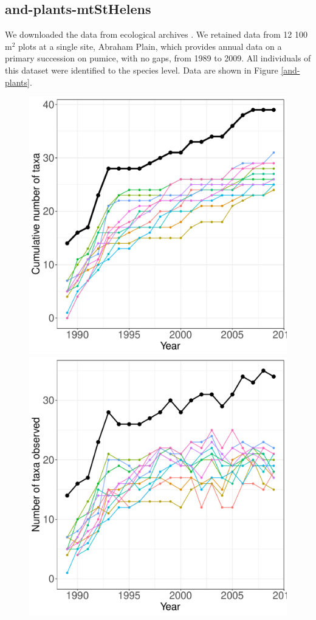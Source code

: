 \documentclass[11pt, oneside]{article}
\begin{document}
\subsection {and-plants-mtStHelens}
We downloaded the data from ecological archives \citep{del_moral_thirty_2010}. We retained data from 12 100 m$^2$ plots at a single site, Abraham Plain, which provides annual data on a primary succession on pumice, with no gaps, from 1989 to 2009. All individuals of this dataset were identified to the species level. Data are shown in Figure \ref{and-plants}.
\begin{figure}[h!]
\centering
\includegraphics[scale = 0.4]{and-plants-mtStHelens_species_accumulation_curve.pdf}
\includegraphics[scale = 0.4]{and-plants-mtStHelens_num_taxa_over_time.pdf}

\end{figure}
\end{document}

